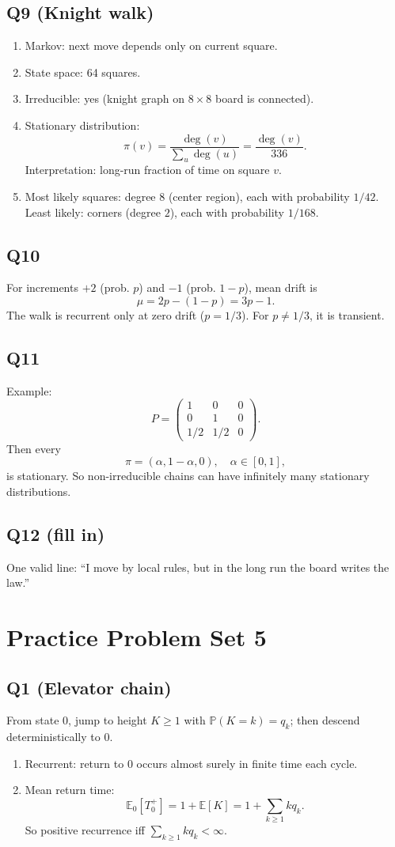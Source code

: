 \documentclass[11pt]{article}
\newcommand{\PP}{\mathbb{P}}
\newcommand{\EE}{\mathbb{E}}
\newcommand{\1}{\mathbf{1}}
\begin{document}
\subsection*{Q9 (Knight walk)}
\begin{enumerate}[label=(\alph*)]
\item Markov: next move depends only on current square.
\item State space: 64 squares.
\item Irreducible: yes (knight graph on $8\times8$ board is connected).
\item Stationary distribution:
\[
\pi(v)=\frac{\deg(v)}{\sum_u \deg(u)}=\frac{\deg(v)}{336}.
\]
Interpretation: long-run fraction of time on square $v$.
\item Most likely squares: degree $8$ (center region), each with probability $1/42$.
Least likely: corners (degree $2$), each with probability $1/168$.
\end{enumerate}

\subsection*{Q10}
For increments $+2$ (prob. $p$) and $-1$ (prob. $1-p$), mean drift is
\[
\mu=2p-(1-p)=3p-1.
\]
The walk is recurrent only at zero drift ($p=1/3$). For $p\ne1/3$, it is transient.

\subsection*{Q11}
Example:
\[
P=\begin{pmatrix}
1&0&0\\
0&1&0\\
1/2&1/2&0
\end{pmatrix}.
\]
Then every
\[
\pi=(\alpha,1-\alpha,0),\quad \alpha\in[0,1],
\]
is stationary. So non-irreducible chains can have infinitely many stationary distributions.

\subsection*{Q12 (fill in)}
One valid line: ``I move by local rules, but in the long run the board writes the law.''

\section{Practice Problem Set 5}

\subsection*{Q1 (Elevator chain)}
From state $0$, jump to height $K\ge1$ with $\PP(K=k)=q_k$; then descend deterministically to $0$.
\begin{enumerate}[label=(\alph*)]
\item Recurrent: return to $0$ occurs almost surely in finite time each cycle.
\item Mean return time:
\[
\EE_0[T_0^+]=1+\EE[K]=1+\sum_{k\ge1}kq_k.
\]
So positive recurrence iff $\sum_{k\ge1}kq_k<\infty$.
\end{enumerate}
\end{document}
